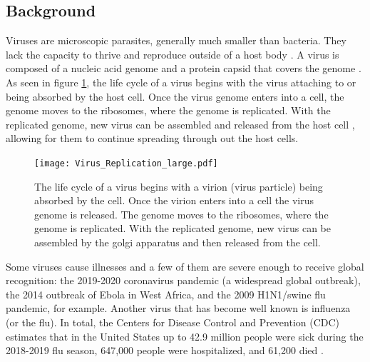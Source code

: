 \documentclass[a4paper]{article}
\begin{document}
\subsection{Background}
Viruses are microscopic parasites, generally much smaller than bacteria. They lack the capacity to thrive and reproduce outside of a host body \cite{website2}. A virus is composed of a nucleic acid genome and a protein capsid that covers the genome \cite{website3}. As seen in figure \ref{fig:Virus_Replication}, the life cycle of a virus begins with the virus attaching to or being absorbed by the host cell. Once the virus genome enters into a cell, the genome moves to the ribosomes, where the genome is replicated. With the replicated genome, new virus can be assembled and released from the host cell \cite{Kaiser}, allowing for them to continue spreading through out the host cells.

\begin{figure}[h]
    \centering
    \texttt{[image: Virus\_Replication\_large.pdf]}
    \caption{The life cycle of a virus begins with a virion (virus particle) being absorbed by the cell. Once the virion enters into a cell the virus genome is released. The genome moves to the ribosomes, where the genome is replicated. With the replicated genome, new virus can be assembled by the golgi apparatus and then released from the cell.}
    \label{fig:Virus_Replication}
\end{figure}

Some viruses cause illnesses and a few of them are severe enough to receive global recognition: the 2019-2020 coronavirus pandemic (a widespread global outbreak), the 2014 outbreak of Ebola in West Africa, and the 2009 H1N1/swine flu pandemic, for example. Another virus that has become well known is influenza (or the flu). In total, the Centers for Disease Control and Prevention (CDC) estimates that in the United States up to 42.9 million people were sick during the 2018-2019 flu season, 647,000 people were hospitalized, and 61,200 died \cite{website4}.
\end{document}
